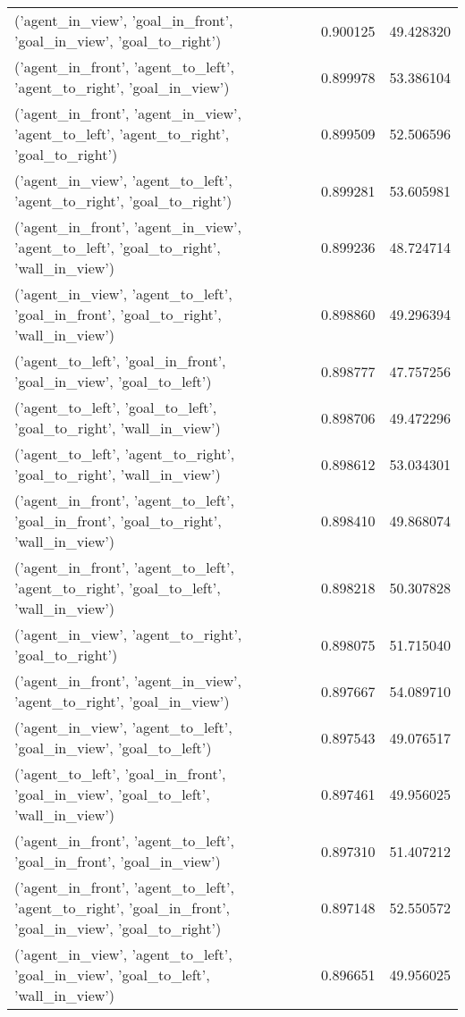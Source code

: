 \begin{tabular}{lrr}
('agent\_in\_view', 'goal\_in\_front', 'goal\_in\_view', 'goal\_to\_right') & 0.900125 & 49.428320 \\
('agent\_in\_front', 'agent\_to\_left', 'agent\_to\_right', 'goal\_in\_view') & 0.899978 & 53.386104 \\
('agent\_in\_front', 'agent\_in\_view', 'agent\_to\_left', 'agent\_to\_right', 'goal\_to\_right') & 0.899509 & 52.506596 \\
('agent\_in\_view', 'agent\_to\_left', 'agent\_to\_right', 'goal\_to\_right') & 0.899281 & 53.605981 \\
('agent\_in\_front', 'agent\_in\_view', 'agent\_to\_left', 'goal\_to\_right', 'wall\_in\_view') & 0.899236 & 48.724714 \\
('agent\_in\_view', 'agent\_to\_left', 'goal\_in\_front', 'goal\_to\_right', 'wall\_in\_view') & 0.898860 & 49.296394 \\
('agent\_to\_left', 'goal\_in\_front', 'goal\_in\_view', 'goal\_to\_left') & 0.898777 & 47.757256 \\
('agent\_to\_left', 'goal\_to\_left', 'goal\_to\_right', 'wall\_in\_view') & 0.898706 & 49.472296 \\
('agent\_to\_left', 'agent\_to\_right', 'goal\_to\_right', 'wall\_in\_view') & 0.898612 & 53.034301 \\
('agent\_in\_front', 'agent\_to\_left', 'goal\_in\_front', 'goal\_to\_right', 'wall\_in\_view') & 0.898410 & 49.868074 \\
('agent\_in\_front', 'agent\_to\_left', 'agent\_to\_right', 'goal\_to\_left', 'wall\_in\_view') & 0.898218 & 50.307828 \\
('agent\_in\_view', 'agent\_to\_right', 'goal\_to\_right') & 0.898075 & 51.715040 \\
('agent\_in\_front', 'agent\_in\_view', 'agent\_to\_right', 'goal\_in\_view') & 0.897667 & 54.089710 \\
('agent\_in\_view', 'agent\_to\_left', 'goal\_in\_view', 'goal\_to\_left') & 0.897543 & 49.076517 \\
('agent\_to\_left', 'goal\_in\_front', 'goal\_in\_view', 'goal\_to\_left', 'wall\_in\_view') & 0.897461 & 49.956025 \\
('agent\_in\_front', 'agent\_to\_left', 'goal\_in\_front', 'goal\_in\_view') & 0.897310 & 51.407212 \\
('agent\_in\_front', 'agent\_to\_left', 'agent\_to\_right', 'goal\_in\_front', 'goal\_in\_view', 'goal\_to\_right') & 0.897148 & 52.550572 \\
('agent\_in\_view', 'agent\_to\_left', 'goal\_in\_view', 'goal\_to\_left', 'wall\_in\_view') & 0.896651 & 49.956025 \\

\end{tabular}
